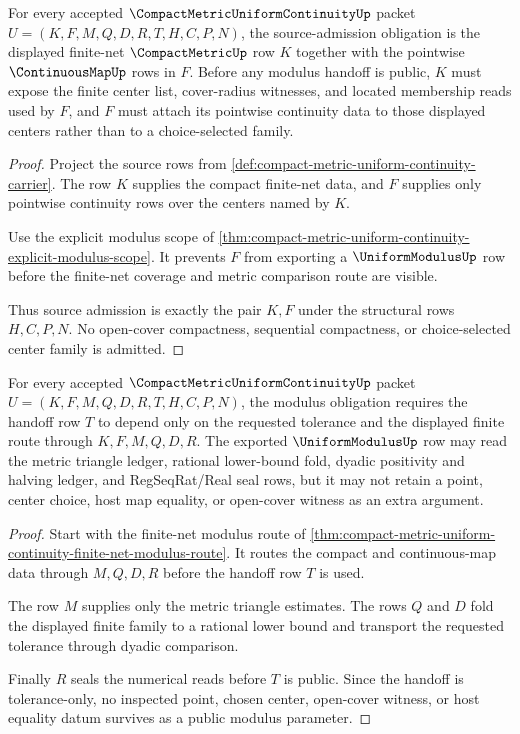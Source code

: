 \begin{theorem}
\label{thm:compact-metric-uniform-continuity-source-obligation}
For every accepted $\CompactMetricUniformContinuityUp$ packet $U=(K,F,M,Q,D,R,T,H,C,P,N)$, the source-admission obligation is the displayed finite-net $\CompactMetricUp$ row $K$ together with the pointwise $\ContinuousMapUp$ rows in $F$. Before any modulus handoff is public, $K$ must expose the finite center list, cover-radius witnesses, and located membership reads used by $F$, and $F$ must attach its pointwise continuity data to those displayed centers rather than to a choice-selected family.
\end{theorem}
\begin{proof}
Project the source rows from \autoref{def:compact-metric-uniform-continuity-carrier}. The row $K$ supplies the compact finite-net data, and $F$ supplies only pointwise continuity rows over the centers named by $K$.

Use the explicit modulus scope of \autoref{thm:compact-metric-uniform-continuity-explicit-modulus-scope}. It prevents $F$ from exporting a $\UniformModulusUp$ row before the finite-net coverage and metric comparison route are visible.

Thus source admission is exactly the pair $K,F$ under the structural rows $H,C,P,N$. No open-cover compactness, sequential compactness, or choice-selected center family is admitted.
\end{proof}

\begin{theorem}
\label{thm:compact-metric-uniform-continuity-modulus-obligation}
For every accepted $\CompactMetricUniformContinuityUp$ packet $U=(K,F,M,Q,D,R,T,H,C,P,N)$, the modulus obligation requires the handoff row $T$ to depend only on the requested tolerance and the displayed finite route through $K,F,M,Q,D,R$. The exported $\UniformModulusUp$ row may read the metric triangle ledger, rational lower-bound fold, dyadic positivity and halving ledger, and RegSeqRat/Real seal rows, but it may not retain a point, center choice, host map equality, or open-cover witness as an extra argument.
\end{theorem}
\begin{proof}
Start with the finite-net modulus route of \autoref{thm:compact-metric-uniform-continuity-finite-net-modulus-route}. It routes the compact and continuous-map data through $M,Q,D,R$ before the handoff row $T$ is used.

The row $M$ supplies only the metric triangle estimates. The rows $Q$ and $D$ fold the displayed finite family to a rational lower bound and transport the requested tolerance through dyadic comparison.

Finally $R$ seals the numerical reads before $T$ is public. Since the handoff is tolerance-only, no inspected point, chosen center, open-cover witness, or host equality datum survives as a public modulus parameter.
\end{proof}

